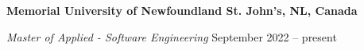 \textbf{Memorial University of Newfoundland \hfill St. John's, NL, Canada} \par
\textit{Master of Applied - Software Engineering} \hfill September 2022 -- present\par
